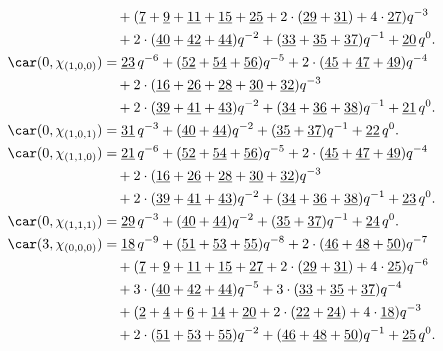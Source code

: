 \begin{align*}
	&\quad+(\underline{7}+\underline{9}+\underline{11}+\underline{15}+\underline{25}+2\cdot(\underline{29}+\underline{31})+4\cdot\underline{27})q^{-3}\\
	&\quad+2\cdot(\underline{40}+\underline{42}+\underline{44})q^{-2}+(\underline{33}+\underline{35}+\underline{37})q^{-1}+\underline{20}\,q^0.\\
	\car(0,\chi_{(1,0,0)})
	&=\underline{23}\,q^{-6}+(\underline{52}+\underline{54}+\underline{56})q^{-5}+2\cdot(\underline{45}+\underline{47}+\underline{49})q^{-4}\\
	&\quad+2\cdot(\underline{16}+\underline{26}+\underline{28}+\underline{30}+\underline{32})q^{-3}\\
	&\quad+2\cdot(\underline{39}+\underline{41}+\underline{43})q^{-2}+(\underline{34}+\underline{36}+\underline{38})q^{-1}+\underline{21}\,q^0.\\
	\car(0,\chi_{(1,0,1)})
	&=\underline{31}\,q^{-3}+(\underline{40}+\underline{44})q^{-2}+(\underline{35}+\underline{37})q^{-1}+\underline{22}\,q^0.\\
	\car(0,\chi_{(1,1,0)})
	&=\underline{21}\,q^{-6}+(\underline{52}+\underline{54}+\underline{56})q^{-5}+2\cdot(\underline{45}+\underline{47}+\underline{49})q^{-4}\\
	&\quad+2\cdot(\underline{16}+\underline{26}+\underline{28}+\underline{30}+\underline{32})q^{-3}\\
	&\quad+2\cdot(\underline{39}+\underline{41}+\underline{43})q^{-2}+(\underline{34}+\underline{36}+\underline{38})q^{-1}+\underline{23}\,q^0.\\
	\car(0,\chi_{(1,1,1)})
	&=\underline{29}\,q^{-3}+(\underline{40}+\underline{44})q^{-2}+(\underline{35}+\underline{37})q^{-1}+\underline{24}\,q^0.\\
	\car(3,\chi_{(0,0,0)})
	&=\underline{18}\,q^{-9}+(\underline{51}+\underline{53}+\underline{55})q^{-8}+2\cdot(\underline{46}+\underline{48}+\underline{50})q^{-7}\\
	&\quad+(\underline{7}+\underline{9}+\underline{11}+\underline{15}+\underline{27}+2\cdot(\underline{29}+\underline{31})+4\cdot\underline{25})q^{-6}\\
	&\quad+3\cdot(\underline{40}+\underline{42}+\underline{44})q^{-5}+3\cdot(\underline{33}+\underline{35}+\underline{37})q^{-4}\\
	&\quad+(\underline{2}+\underline{4}+\underline{6}+\underline{14}+\underline{20}+2\cdot(\underline{22}+\underline{24})+4\cdot\underline{18})q^{-3}\\
	&\quad+2\cdot(\underline{51}+\underline{53}+\underline{55})q^{-2}+(\underline{46}+\underline{48}+\underline{50})q^{-1}+\underline{25}\,q^0.\\

\end{align*}
